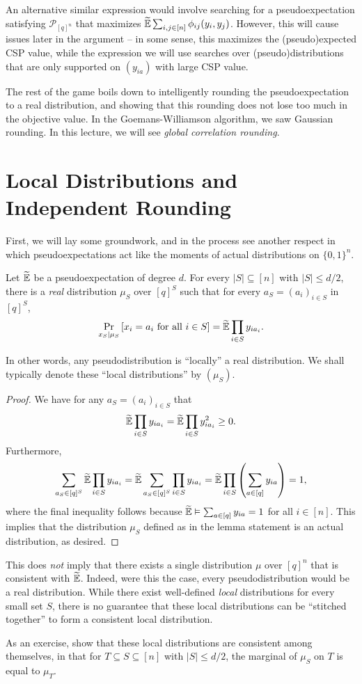 \documentclass{article}
\begin{document}
An alternative similar expression would involve searching for a pseudoexpectation satisfying $\mathcal{P}_{[q]^n}$ that maximizes $\widetilde{\mathbb{E}} \sum_{i,j \in [n]} \phi_{ij}(y_i,y_j)$. However, this will cause issues later in the argument -- in some sense, this maximizes the (pseudo)expected CSP value, while the expression we will use searches over (pseudo)distributions that are only supported on $(y_{ia})$ with large CSP value.

The rest of the game boils down to intelligently rounding the pseudoexpectation to a real distribution, and showing that this rounding does not lose too much in the objective value. In the Goemans-Williamson algorithm, we saw Gaussian rounding. In this lecture, we will see \emph{global correlation rounding}. 

\section{Local Distributions and Independent Rounding}

First, we will lay some groundwork, and in the process see another respect in which pseudoexpectations act like the moments of actual distributions on $\{0,1\}^n$.

\begin{flem}
	\label{lem:local-distributions}
	Let $\widetilde{\mathbb{E}}$ be a pseudoexpectation of degree $d$. For every $|S| \subseteq [n]$ with $|S| \leq d/2$, there is a \emph{real} distribution $\mu_S$ over $[q]^S$ such that for every $a_S = (a_i)_{i \in S}$ in $[q]^S$,
	\[ \Pr_{x_S \mid \mu_S} \left[ x_i = a_i \text{ for all } i \in S \right] = \widetilde{\mathbb{E}} \prod_{i \in S} y_{i a_i}. \]
\end{flem}
In other words, any pseudodistribution is ``locally'' a real distribution. We shall typically denote these ``local distributions'' by $(\mu_S)$.
\begin{proof}
	We have for any $a_S = (a_i)_{i \in S}$ that
	\[ \widetilde{\mathbb{E}} \prod_{i \in S} y_{i a_i} = \widetilde{\mathbb{E}} \prod_{i \in S} y_{i a_i}^2 \ge 0. \]
	Furthermore,
	\[ \sum_{a_S \in [q]^S} \widetilde{\mathbb{E}} \prod_{i \in S} y_{i a_i} = \widetilde{\mathbb{E}} \sum_{a_S \in [q]^S} \prod_{i \in S} y_{i a_i} = \widetilde{\mathbb{E}} \prod_{i \in S} \left( \sum_{a \in [q]} y_{ia} \right) = 1, \]
	where the final inequality follows because $\widetilde{\mathbb{E}} \vDash \sum_{a \in [q]} y_{ia} = 1$ for all $i \in [n]$.
	This implies that the distribution $\mu_S$ defined as in the lemma statement is an actual distribution, as desired.
\end{proof}

\begin{remark}
	This does \emph{not} imply that there exists a single distribution $\mu$ over $[q]^n$ that is consistent with $\widetilde{\mathbb{E}}$. Indeed, were this the case, every pseudodistribution would be a real distribution. While there exist well-defined \emph{local} distributions for every small set $S$, there is no guarantee that these local distributions can be ``stitched together'' to form a consistent local distribution.

	As an exercise, show that these local distributions are consistent among themselves, in that for $T \subseteq S \subseteq [n]$ with $|S| \le d/2$, the marginal of $\mu_S$ on $T$ is equal to $\mu_T$.
\end{remark}
\end{document}
